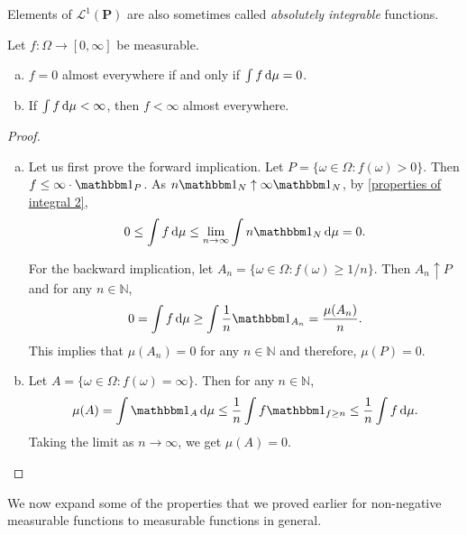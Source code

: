 Elements of $\mathcal{L}^1(\textbf{P})$ are also sometimes called \textit{absolutely integrable} functions. 

\begin{theorem}
\label{properties of integral ae 1}
    Let $f:\Omega\to[0,\infty]$ be measurable.
    \begin{enumerate}[(a)]
        \item $f=0$ almost everywhere if and only if $\int f\operatorname{d}\!{\mu} = 0$.
        \item If $\int f\operatorname{d}\!{\mu}<\infty$, then $f<\infty$ almost everywhere.
    \end{enumerate}
\end{theorem}
\begin{proof}
    ~
    \begin{enumerate}[(a)]
        \item Let us first prove the forward implication. Let $P=\{\omega\in\Omega:f(\omega)>0\}$. Then $f\leq \infty\cdot\indic_{P}$. As $n\indic_{N}\uparrow\infty\indic_{N}$, by \cref{properties of integral 2},
        $$0\leq\int f\d{\mu}\leq\lim_{n\to\infty}\int n\indic_{N}\d{\mu}=0.$$
        
        For the backward implication, let $A_n=\{\omega\in\Omega:f(\omega)\geq 1/n\}$. Then $A_n\uparrow P$ and for any $n\in\mathbb{N}$,
        $$0=\int f\d{\mu} \geq \int \frac{1}{n}\indic_{A_n} = \frac{\mu(A_n)}{n}.$$
        This implies that $\mu(A_n)=0$ for any $n\in\mathbb{N}$ and therefore, $\mu(P)=0$.
        
        \item Let $A=\{\omega\in\Omega:f(\omega)=\infty\}$. Then for any $n\in\mathbb{N}$,
        $$\mu(A)=\int \indic_{A}\d{\mu}\leq \frac{1}{n}\int f\indic_{f\geq n}\leq \frac{1}{n} \int f\d{\mu}.$$
        Taking the limit as $n\to\infty$, we get $\mu(A)=0$.
    \end{enumerate}
\end{proof}

We now expand some of the properties that we proved earlier for non-negative measurable functions to measurable functions in general.


